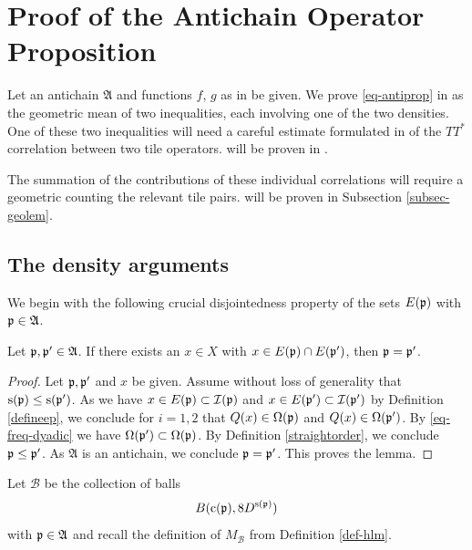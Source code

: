 \section{Proof of the Antichain Operator Proposition}

\label{antichainboundary}

Let an antichain $\mathfrak{A}$
and functions $f$, $g$ as in  be given.
We prove \eqref{eq-antiprop}
in 
as the geometric mean of two inequalities,
each involving one of the two densities.
One of these two inequalities will need a careful estimate formulated in
 of
the $TT^*$ correlation between two tile operators.
 will be proven in
.

The summation of the contributions of these individual correlations will require a
geometric  counting the relevant tile pairs.
 will be proven in Subsection
\ref{subsec-geolem}.






\subsection{The density arguments}\label{sec-TT*-T*T}

We begin with the following crucial disjointedness property of the sets $E({\mathfrak p})$ with ${\mathfrak p} \in \mathfrak{A}$.
\begin{lemma}
\label{tile-disjointness}
\leanok
{}
Let ${\mathfrak p},{\mathfrak p}'\in \mathfrak{A}$.
If there exists an $x\in X$ with $x\in E({\mathfrak p})\cap E({\mathfrak p}')$,
then ${\mathfrak p}= {\mathfrak p}'$.
\end{lemma}
\begin{proof}
\leanok
Let ${\mathfrak p},{\mathfrak p}'$ and $x$ be given.
Assume without loss of generality that ${\mathrm{s}}({\mathfrak p})\le {\mathrm{s}}({\mathfrak p}')$.
As we have $x\in E({\mathfrak p})\subset {\mathcal{I}}({\mathfrak p})$ and $x\in E({\mathfrak p}')\subset {\mathcal{I}}({\mathfrak p}')$ by Definition \eqref{defineep}, we conclude
for $i=1,2$ that
${Q}(x)\in{\Omega}({\mathfrak p})$ and ${Q}(x)\in{\Omega}({\mathfrak p}')$. By \eqref{eq-freq-dyadic} we have ${\Omega}({\mathfrak p}')\subset {\Omega}({\mathfrak p})$. By Definition
\eqref{straightorder}, we conclude ${\mathfrak p}\le {\mathfrak p}'$. As $\mathfrak{A}$ is an antichain, we conclude ${\mathfrak p}={\mathfrak p}'$.
This proves the lemma.
\end{proof}



Let $\mathcal{B}$ be the collection of balls
\begin{equation}
    B({\mathrm{c}}({\mathfrak p}), 8D^{{\mathrm{s}}({\mathfrak p})})
\end{equation}
with ${\mathfrak p}\in \mathfrak{A}$ and recall the definition of
$M_{\mathcal{B}}$ from Definition \ref{def-hlm}.

